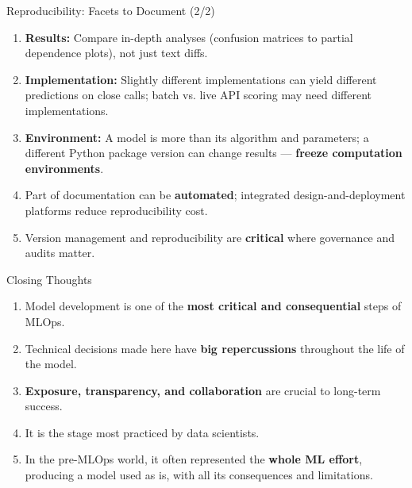 \begin{frame}{Reproducibility: Facets to Document (2/2)}
\begin{enumerate}
\item<1-> \textbf{Results:} Compare in-depth analyses (confusion matrices to partial dependence plots), not just text diffs.
\item<2-> \textbf{Implementation:} Slightly different implementations can yield different predictions on close calls; batch vs. live API scoring may need different implementations.
\item<3-> \textbf{Environment:} A model is more than its algorithm and parameters; a different Python package version can change results --- \textbf{freeze computation environments}.
\item<4-> Part of documentation can be \textbf{automated}; integrated design-and-deployment platforms reduce reproducibility cost.
\item<5-> Version management and reproducibility are \textbf{critical} where governance and audits matter.
\end{enumerate}
\end{frame}

\begin{frame}{Closing Thoughts}
\begin{enumerate}
\item<1-> Model development is one of the \textbf{most critical and consequential} steps of MLOps.
\item<2-> Technical decisions made here have \textbf{big repercussions} throughout the life of the model.
\item<3-> \textbf{Exposure, transparency, and collaboration} are crucial to long-term success.
\item<4-> It is the stage most practiced by data scientists.
\item<5-> In the pre-MLOps world, it often represented the \textbf{whole ML effort}, producing a model used as is, with all its consequences and limitations.
\end{enumerate}
\end{frame}